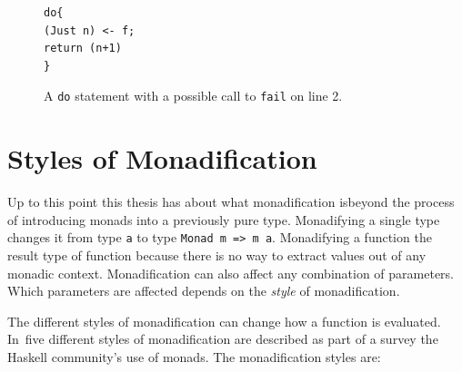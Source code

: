 \begin{figure}[t]
\begin{lstlisting}
do{
(Just n) <- f;
return (n+1)
}
\end{lstlisting}
\caption{A \texttt{do} statement with a possible call to \texttt{fail} on line 2.}
\label{failCall}
\end{figure}

\DIFaddbegin {}\texttt{} \texttt{\DIFadd{(>>=)}} 

\DIFaddend \section{Styles of Monadification}
\label{monadStyles}

Up to this point this thesis has \DIFdelbegin {}\DIFdelend \DIFaddbegin {}\DIFaddend about what monadification is\DIFaddbegin \DIFadd{, }\DIFaddend beyond the process of introducing monads into a previously pure type. Monadifying a single type changes it from type \texttt{a} to type \texttt{Monad m => m a}. Monadifying a function \DIFdelbegin {}\DIFdelend \DIFaddbegin {}\DIFaddend the result type of \DIFdelbegin {}\DIFdelend \DIFaddbegin {}\DIFaddend function because there is no way to extract values out of any \DIFdelbegin {}\DIFdelend monadic context. Monadification can also affect any combination of parameters. Which parameters are affected depends on the \textit{style} of monadification.

The different styles of monadification can change how a function is evaluated. In~\DIFdelbegin {}\DIFdelend \DIFaddbegin {}\DIFaddend five different styles of monadification are described as part of a survey \DIFdelbegin {}\DIFdelend \DIFaddbegin {}\DIFaddend the Haskell community's use of monads. The monadification styles are:


